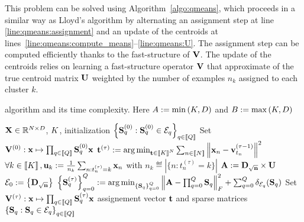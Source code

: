 This problem can be solved using Algorithm~\ref{algo:qmeans},
which proceeds in a similar way as Lloyd's algorithm by alternating an assignment step at line \ref{line:qmeans:assignment} and an update of the centroids at lines~\ref{line:qmeans:compute_means}--\ref{line:qmeans:U}. The assignment step can be computed efficiently thanks to the fast-structure of ${\mathbf{V}}$. The update of the centroids relies on learning a fast-structure operator ${\mathbf{V}}$ that approximate of the true centroid matrix ${\mathbf{U}}$ weighted by the number of examples $n_k$ assigned to each cluster $k$.


\begin{algorithm*}[t]
	\caption{\qkmeans algorithm and its time complexity. Here $A := \min\left (K, D\right )$ and $B := \max\left (K, D\right )$}
	\label{algo:qmeans}
	\begin{algorithmic}[1]
\REQUIRE ${\mathbf{X}} \in \mathbb{R}^{N \times D}$, $K$, initialization $\left \lbrace {\mathbf{S}}_q^{(0)} : {\mathbf{S}}_q^{(0)} \in \mathcal{E}_q\right \rbrace_{q\in\left \llbracket Q\right \rrbracket}$
\STATE Set ${\mathbf{V}}^{(0)} : {\mathbf{x}} \mapsto \prod_{q\in\left \llbracket Q\right \rrbracket}{{\mathbf{S}}_q^{(0)}} {\mathbf{x}}$
	\STATE ${\mathbf{t}}^{(\tau)} := \operatorname*{arg\,min}_{{\mathbf{t}} \in \left \llbracket K\right \rrbracket^N} \sum_{n\in\left \llbracket N\right \rrbracket} {\left \|{\mathbf{x}}_n - {\mathbf{v}}^{(\tau -1)}_{t_n}\right \|^2}$
	\label{line:qmeans:assignment}
	\STATE $\forall k\in\left \llbracket K\right \rrbracket, {\mathbf{u}}_k := \frac{1}{n_k} \sum_{n: t_n^{(\tau)}= k} {{\mathbf{x}}_n}$
with $n_k \eqdef |\{n: t_n^{(\tau)}=k\}|$
	\COMMENT{$\bigO{\nexamples\datadim}$}
	\label{line:qmeans:compute_means}
	\STATE ${\mathbf{A}} := {\mathbf{D}}_{\sqrt{{\mathbf{n}}}} \times {\mathbf{U}} $
	\COMMENT{$\bigO{\nclusters\datadim}$}
	\label{line:qmeans:A}
	\STATE $\mathcal{E}_0 := \left \lbrace {\mathbf{D}}_{\sqrt{{\mathbf{n}}}} \right \rbrace$
	\label{line:qmeans:E0}
	\STATE $\left \lbrace {\mathbf{S}}_q^{(\tau)}\right \rbrace_{q=0}^Q := \operatorname*{arg\,min}_{\left \lbrace {\mathbf{S}}_q\right \rbrace_{q=0}^Q} \left \|{\mathbf{A}} - \prod_{q=0}^Q{\mathbf{S}}_q\right \|_F^2 + \sum_{q=0}^Q \delta_{\mathcal{E}_q}({\mathbf{S}}_q)$
	\label{line:qmeans:S}
	\STATE Set ${\mathbf{V}}^{(\tau)} : {\mathbf{x}} \mapsto \prod_{q\in\left \llbracket Q\right \rrbracket}{{\mathbf{S}}_q^{(\tau)}} {\mathbf{x}}$
	\label{line:qmeans:U}
	\ENDFOR
	\ENSURE assignement vector ${\mathbf{t}}$ and sparse matrices $\left \lbrace {\mathbf{S}}_q : {\mathbf{S}}_q \in \mathcal{E}_q\right \rbrace_{q\in\left \llbracket Q\right \rrbracket}$ %
\end{algorithmic}
\end{algorithm*}

